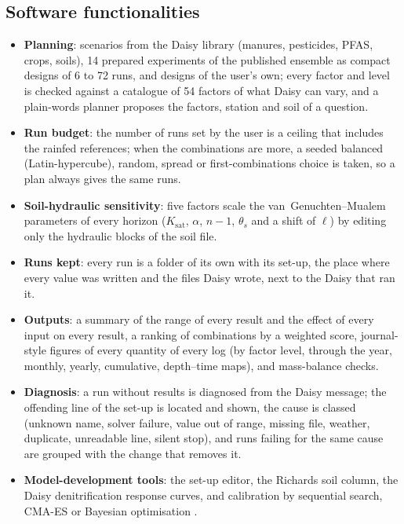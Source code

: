 \documentclass[preprint,12pt]{elsarticle}
\begin{document}
\subsection{Software functionalities}
\begin{itemize}[nosep]
\item \textbf{Planning}: scenarios from the Daisy library (manures, pesticides, PFAS, crops, soils), 14 prepared experiments of the published ensemble as compact designs of 6 to 72 runs, and designs of the user's own; every factor and level is checked against a catalogue of 54 factors of what Daisy can vary, and a plain-words planner proposes the factors, station and soil of a question.
\item \textbf{Run budget}: the number of runs set by the user is a ceiling that includes the rainfed references; when the combinations are more, a seeded balanced (Latin-hypercube), random, spread or first-combinations choice is taken, so a plan always gives the same runs.
\item \textbf{Soil-hydraulic sensitivity}: five factors scale the van~Genuchten--Mualem parameters of every horizon ($K_\mathrm{sat}$, $\alpha$, $n-1$, $\theta_s$ and a shift of $\ell$) by editing only the hydraulic blocks of the soil file.
\item \textbf{Runs kept}: every run is a folder of its own with its set-up, the place where every value was written and the files Daisy wrote, next to the Daisy that ran it.
\item \textbf{Outputs}: a summary of the range of every result and the effect of every input on every result, a ranking of combinations by a weighted score, journal-style figures of every quantity of every log (by factor level, through the year, monthly, yearly, cumulative, depth--time maps), and mass-balance checks.
\item \textbf{Diagnosis}: a run without results is diagnosed from the Daisy message; the offending line of the set-up is located and shown, the cause is classed (unknown name, solver failure, value out of range, missing file, weather, duplicate, unreadable line, silent stop), and runs failing for the same cause are grouped with the change that removes it.
\item \textbf{Model-development tools}: the set-up editor, the Richards soil column, the Daisy denitrification response curves, and calibration by sequential search, CMA-ES \cite{HansenOstermeier2001} or Bayesian optimisation \cite{Mockus1978}.
\end{itemize}
\end{document}

